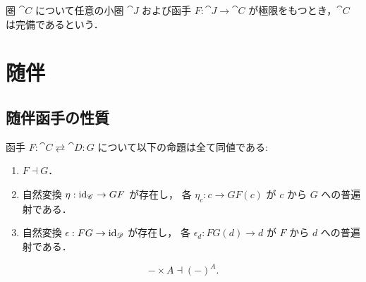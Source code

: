 \documentclass[titlepage]{ltjsreport}
\newtheorem[S]{theorem}{定理}[chapter]
\newtheorem[S]{definition}[theorem]{定義}
\newtheorem[S]{example}[theorem]{例}
\begin{document}
\begin{definition}[完備]
  圏 $\cat{C}$ について任意の小圏 $\cat{J}$ および函手 $F:\cat{J}\to\cat{C}$
  が極限をもつとき，$\cat{C}$ は完備であるという．
\end{definition}

\chapter{随伴}

\section{随伴函手の性質}

\begin{theorem}[随伴函手の並列定義]\label{thm:adjoint-functor-definitions}
  函手 $F:\cat{C}\rightleftarrows\cat{D}:G$ について以下の命題は全て同値である:
  \begin{enumerate}
    \item $F\dashv G$．
    \item 自然変換 $\eta:\mathrm{id}_{\mathscr{C}}\to GF$ が存在し，
          各 $\eta_c:c\to GF(c)$ が $c$ から $G$ への普遍射である．
    \item 自然変換 $\epsilon:FG\to\mathrm{id}_{\mathscr{D}}$ が存在し，
          各 $\epsilon_d:FG(d)\to d$ が $F$ から $d$ への普遍射である．
  \end{enumerate}
\end{theorem}

\begin{theorem}[並列定義の系]
  \begin{equation}
    -\times A\dashv{(-)}^A.
  \end{equation}
\end{theorem}
\end{document}

